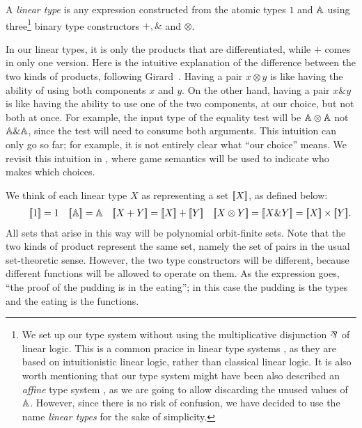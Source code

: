 \documentclass[a4paper,UKenglish,cleveref, autoref, numberwithinsect, thm-restate]{lipics-v2021}
\begin{document}
\begin{definition}\label{def:datatypes}
    A \emph{linear type} is any expression constructed from the atomic types $1$ and $\mathbb A$ using three\footnote{
    We set up our type system without using the multiplicative disjunction $\rotatebox[origin=c]{180}{\&}$ of linear logic.
    This is a common pracice in linear type systems \cite{wadler1990linear}, as they are based on intuitionistic linear logic,
    rather than classical linear logic. It is also worth mentioning that our type system might have been also described an \emph{affine} type system \cite{asperti1998light},
    as we are going to allow discarding the unused values of $\mathbb A$. However, since there is no risk of confusion, 
    we have decided to use the name \emph{linear types} for the sake of simplicity.} binary type constructors $+, \&$ and $\otimes$.
\end{definition}
In our linear types, it is only the products that are differentiated, while  $+$ comes in only one version. 
    Here is the intuitive explanation of the difference between the two kinds of products, following Girard~\cite[p.~2]{girard1995advances}. Having a pair $x \otimes y$ is like having the ability of using both components $x$ and $y$. On the other hand, having a pair $x \& y$ is like having the ability to use one of the two components, at our choice, but not both at once. For example, the input type of the equality test will be $\mathbb A \otimes \mathbb A$ not $\mathbb A \& \mathbb A$, since the test will need to consume both arguments. This intuition can only go so far; for example, it is not entirely clear what ``our choice'' means. We revisit this intuition in , where game semantics will be used to indicate who makes which choices. 



We think of each linear type $X$ as representing a set $[{\kern-0.45ex}[X]{\kern-0.45ex}]$, as defined below:
\begin{align*}
    \qquad \sem{1} = 1
\quad 
\sem{\atoms} = \atoms 
\quad 
\sem{X+Y} = \sem X + \sem Y 
\quad 
\sem{X \otimes Y} =
\sem{X \& Y} = \sem X \times \sem Y.
\end{align*}
All sets that arise in this way will be polynomial orbit-finite sets.
Note that the two kinds of product represent the same set, namely the set of pairs in the usual set-theoretic sense. 
However, the two type constructors will be  different, because different functions will be allowed to operate on them. As the expression goes, ``the proof of the pudding is in the eating''; in this case the pudding is the types and the eating is the functions.  
\end{document}
